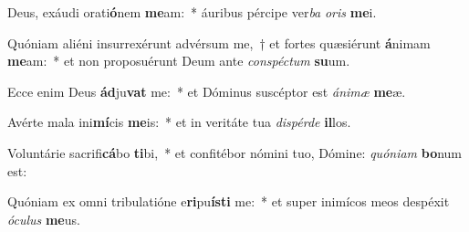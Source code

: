 \item Deus, exáudi orati\textbf{ó}nem \textbf{me}am:~* áuribus pércipe ver\textit{ba} \textit{o}\textit{ris} \textbf{me}i.
\item Quóniam aliéni insurrexérunt advérsum me,~† et fortes quæsiérunt \textbf{á}nimam \textbf{me}am:~* et non proposuérunt Deum ante \textit{con}\textit{spéc}\textit{tum} \textbf{su}um.
\item Ecce enim Deus \textbf{ád}ju\textbf{vat} me:~* et Dóminus suscéptor est \textit{á}\textit{ni}\textit{mæ} \textbf{me}æ.
\item Avérte mala ini\textbf{mí}cis \textbf{me}is:~* et in veritáte tua \textit{dis}\textit{pér}\textit{de} \textbf{il}los.
\item Voluntárie sacrifi\textbf{cá}bo \textbf{ti}bi,~* et confitébor nómini tuo, Dómine: \textit{quón}\textit{i}\textit{am} \textbf{bo}num est:
\item Quóniam ex omni tribulatióne e\textbf{ri}pu\textbf{ís}\textbf{ti} me:~* et super inimícos meos despéxit \textit{ó}\textit{cu}\textit{lus} \textbf{me}us.
